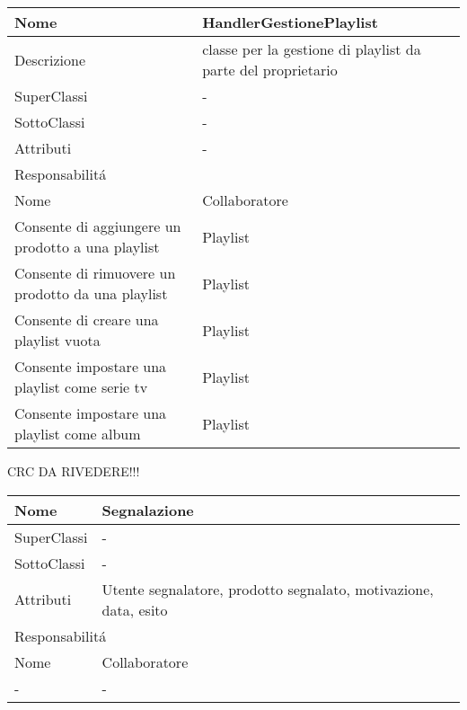 \begin{center} 
    \begin{longtable}{ |p{3cm}|p{3cm}|p{3cm}|p{3cm}| }
        \hline
        Nome & \multicolumn{3}{|p{9cm}|}{HandlerGestionePlaylist} \\\hline
        Descrizione & \multicolumn{3}{|p{9cm}|}{classe per la gestione di playlist da parte del proprietario} \\\hline
        SuperClassi & \multicolumn{3}{|p{9cm}|}{-} \\\hline
        SottoClassi & \multicolumn{3}{|p{9cm}|}{-} \\\hline
        Attributi & \multicolumn{3}{|p{9cm}|}{-} \\\hline
        \multicolumn{4}{|p{12cm}|}{Responsabilit\'a} \\\hline %
        \multicolumn{2}{|p{6cm}|}{Nome} & \multicolumn{2}{|p{6cm}|}{Collaboratore} \\\hline
        \multicolumn{2}{|p{6cm}|}{Consente di aggiungere un prodotto a una playlist} & \multicolumn{2}{|p{6cm}|}{Playlist} \\\hline
        \multicolumn{2}{|p{6cm}|}{Consente di rimuovere un prodotto da una playlist} & \multicolumn{2}{|p{6cm}|}{Playlist} \\\hline
        \multicolumn{2}{|p{6cm}|}{Consente di creare una playlist vuota} & \multicolumn{2}{|p{6cm}|}{Playlist} \\\hline
        \multicolumn{2}{|p{6cm}|}{Consente impostare una playlist come serie tv} & \multicolumn{2}{|p{6cm}|}{Playlist} \\\hline
        \multicolumn{2}{|p{6cm}|}{Consente impostare una playlist come album} & \multicolumn{2}{|p{6cm}|}{Playlist} \\\hline
    \end{longtable}
\end{center}




\newpage
CRC DA RIVEDERE!!!
\begin{center}
    \begin{tabular}{ |p{3cm}|p{3cm}|p{3cm}|p{3cm}| }
        \hline
        Nome & \multicolumn{3}{|p{9cm}|}{Segnalazione} \\\hline
        SuperClassi & \multicolumn{3}{|p{9cm}|}{-} \\\hline
        SottoClassi & \multicolumn{3}{|p{9cm}|}{-} \\\hline
        Attributi & \multicolumn{3}{|p{9cm}|}{Utente segnalatore, prodotto segnalato, motivazione, data, esito} \\\hline
        \multicolumn{4}{|p{12cm}|}{Responsabilit\'a} \\\hline
        \multicolumn{2}{|p{6cm}|}{Nome} & \multicolumn{2}{|p{6cm}|}{Collaboratore} \\\hline
        \multicolumn{2}{|p{6cm}|}{-} & \multicolumn{2}{|p{6cm}|}{-} \\\hline
    \end{tabular}
\end{center}

